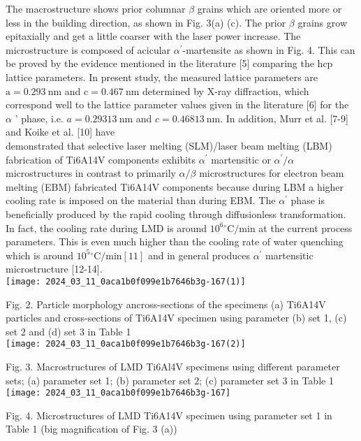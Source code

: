 \documentclass[10pt]{article}
\begin{document}
The macrostructure shows prior columnar $\beta$ grains which are oriented more or less in the building direction, as shown in Fig. 3(a) (c). The prior $\beta$ grains grow epitaxially and get a little coarser with the laser power increase. The microstructure is composed of acicular $\alpha^{\prime}$-martensite as shown in Fig. 4. This can be proved by the evidence mentioned in the literature [5] comparing the hcp lattice parameters. In present study, the measured lattice parameters are $\mathrm{a}=0.293 \mathrm{~nm}$ and $\mathrm{c}=0.467 \mathrm{~nm}$ determined by X-ray diffraction, which correspond well to the lattice parameter values given in the literature [6] for the $\alpha$ ' phase, i.e. $a=0.29313 \mathrm{~nm}$ and $c=0.46813 \mathrm{~nm}$. In addition, Murr et al. [7-9] and Koike et al. [10] have\\
demonstrated that selective laser melting (SLM)/laser beam melting (LBM) fabrication of Ti6A14V components exhibits $\alpha^{\prime}$ martensitic or $\alpha^{\prime} / \alpha$ microstructures in contrast to primarily $\alpha / \beta$ microstructures for electron beam melting (EBM) fabricated Ti6A14V components because during LBM a higher cooling rate is imposed on the material than during EBM. The $\alpha^{\prime}$ phase is beneficially produced by the rapid cooling through diffusionless transformation. In fact, the cooling rate during LMD is around $10^{6}{ }^{\circ} \mathrm{C} / \mathrm{min}$ at the current process parameters. This is even much higher than the cooling rate of water quenching which is around $10^{5}{ }^{\circ} \mathrm{C} / \mathrm{min}[11]$ and in general produces $\alpha^{\prime}$ martensitic microstructure [12-14].\\
\texttt{[image: 2024\_03\_11\_0aca1b0f099e1b7646b3g-167(1)]}

Fig. 2. Particle morphology ancross-sections of the specimens (a) Ti6A14V particles and cross-sections of Ti6A14V specimen using parameter (b) set 1, (c) set 2 and (d) set 3 in Table 1\\
\texttt{[image: 2024\_03\_11\_0aca1b0f099e1b7646b3g-167(2)]}

Fig. 3. Macrostructures of LMD Ti6Al4V specimens using different parameter sets; (a) parameter set 1; (b) parameter set 2; (c) parameter set 3 in Table 1\\
\texttt{[image: 2024\_03\_11\_0aca1b0f099e1b7646b3g-167]}

Fig. 4. Microstructures of LMD Ti6A14V specimen using parameter set 1 in Table 1 (big magnification of Fig. 3 (a))
\end{document}
